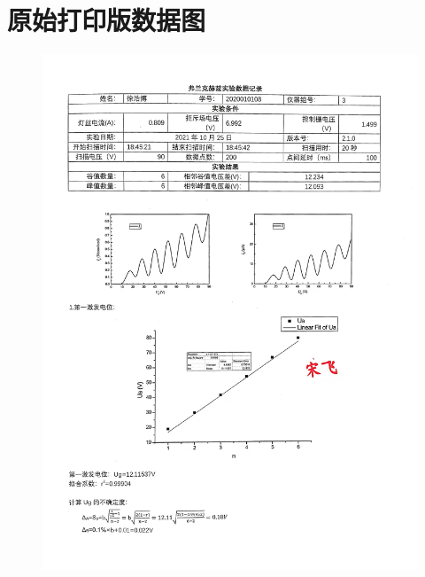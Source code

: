 \documentclass[UTF8]{ctexart}
\begin{document}
\newpage
\section{原始打印版数据图}

    \begin{figure}[H]\begin{center}
        \includegraphics[scale=0.25]{data1.jpg}
    \end{center} \end{figure}
\end{document}
